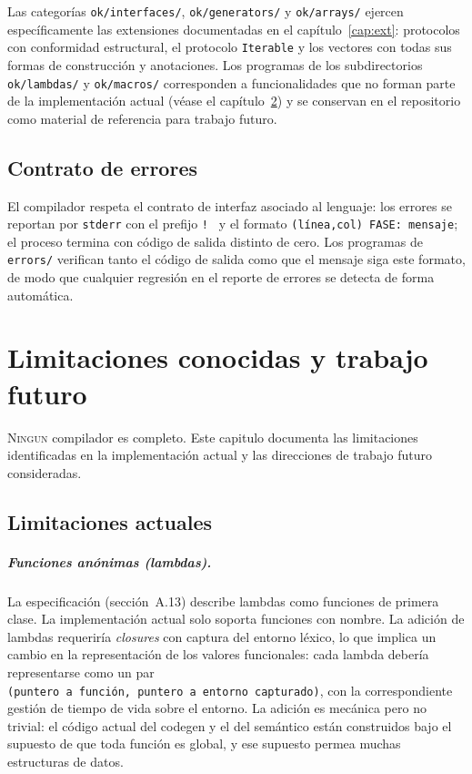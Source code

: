 \documentclass[11pt,a4paper,oneside,openany]{report}
\newcommand{\code}[1]{\texttt{#1}}
\begin{document}
Las categorías \code{ok/interfaces/}, \code{ok/generators/} y \code{ok/arrays/}
ejercen específicamente las extensiones documentadas en el capítulo~\ref{cap:ext}:
protocolos con conformidad estructural, el protocolo \code{Iterable} y los
vectores con todas sus formas de construcción y anotaciones. Los programas de
los subdirectorios \code{ok/lambdas/} y \code{ok/macros/} corresponden a
funcionalidades que no forman parte de la implementación actual
(véase el capítulo~\ref{cap:lim}) y se conservan en el repositorio como
material de referencia para trabajo futuro.

\section{Contrato de errores}

El compilador respeta el contrato de interfaz asociado al lenguaje: los errores
se reportan por \code{stderr} con el prefijo \code{!\ } y el formato
\code{(línea,col) FASE: mensaje}; el proceso termina con código de salida
distinto de cero. Los programas de \code{errors/} verifican tanto el código de
salida como que el mensaje siga este formato, de modo que cualquier regresión
en el reporte de errores se detecta de forma automática.

\chapter{Limitaciones conocidas y trabajo futuro}
\label{cap:lim}

\lettrine[lines=2,findent=2pt,nindent=0pt]{N}{ingun} compilador es completo. Este
capitulo documenta las limitaciones identificadas en la implementación actual y
las direcciones de trabajo futuro consideradas.

\section{Limitaciones actuales}

\paragraph{Funciones anónimas (lambdas).}
La especificación (sección~A.13) describe lambdas como funciones de primera
clase. La implementación actual solo soporta funciones con nombre. La adición de
lambdas requeriría \textit{closures} con captura del entorno léxico, lo que
implica un cambio en la representación de los valores funcionales: cada lambda
debería representarse como un par
\code{(puntero\ a\ función,\ puntero\ a\ entorno\ capturado)}, con la
correspondiente gestión de tiempo de vida sobre el entorno. La adición es
mecánica pero no trivial: el código actual del codegen y el del semántico están
construidos bajo el supuesto de que toda función es global, y ese supuesto
permea muchas estructuras de datos.
\end{document}
